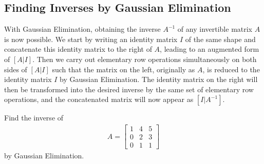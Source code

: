 \subsection{Finding Inverses by Gaussian Elimination}
\label{subsection:invGauss}
With Gaussian Elimination, obtaining the inverse $A^{-1}$ of any invertible matrix $A$ is now possible. We start by writing an identity matrix $I$ of the same shape and concatenate this identity matrix to the right of $A$, leading to an augmented form of $[A|I]$. Then we carry out elementary row operations simultaneously on both sides of $[A|I]$ such that the matrix on the left, originally as $A$, is reduced to the identity matrix $I$ by Gaussian Elimination. The identity matrix on the right will then be transformed into the desired inverse by the same set of elementary row operations, and the concatenated matrix will now appear as $[I|A^{-1}]$. 
\begin{exmp}
Find the inverse of
\begin{align*}
A =
\begin{bmatrix}
1 & 4 & 5 \\
0 & 2 & 3 \\
0 & 1 & 1
\end{bmatrix}
\end{align*}
by Gaussian Elimination.
\end{exmp}
